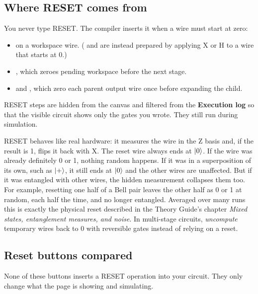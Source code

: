 \subsection{Where RESET comes from}

You never type RESET. The compiler inserts it when a wire must start at zero:
\begin{itemize}
  \item {} on a workspace wire. ( and
   are instead prepared by applying X or H to a wire that
  starts at 0.)
  \item {}, which zeroes pending workspace before the next
  stage.
  \item {} and , which zero each parent output wire
  once before expanding the child.
\end{itemize}
RESET steps are hidden from the canvas and filtered from the
\textbf{Execution log} so that the visible circuit shows only the gates you
wrote. They still run during simulation.

\begin{cautionbox}
RESET behaves like real hardware: it measures the wire in the Z basis and, if
the result is 1, flips it back with X. The reset wire always ends at
$\lvert 0\rangle$. If the wire was already definitely 0 or 1, nothing random happens.
If it was in a superposition of its own, such as $\lvert +\rangle$, it still ends at
$\lvert 0\rangle$ and the other wires are unaffected. But if it was entangled with other
wires, the hidden measurement collapses them too. For example, resetting one
half of a Bell pair leaves the other half as 0 or 1 at random, each half the
time, and no longer entangled. Averaged over many runs this is exactly the
physical reset described in the Theory Guide's chapter \emph{Mixed states,
entanglement measures, and noise}. In multi-stage circuits, \emph{uncompute}
temporary wires back to 0 with reversible gates instead of relying on a reset.
\end{cautionbox}

\subsection{Reset buttons compared}
\hypertarget{reset-buttons}{}

None of these buttons inserts a RESET operation into your circuit. They only
change what the page is showing and simulating.


